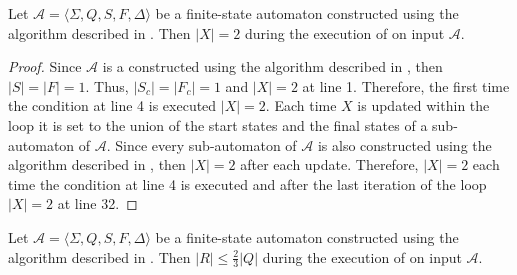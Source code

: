\begin{proposition}\label{prop:thompson_sep_4}
  Let $\mathcal{A} = \langle \Sigma, Q, S, F, \Delta \rangle$ be a finite-state
  automaton constructed using the algorithm described in . Then
  $|X| = 2$ during the execution of  on input
  $\mathcal{A}$.
\end{proposition}

\begin{proof}
  Since $\mathcal{A}$ is a constructed using the algorithm described in
  , then $|S| = |F| = 1$. Thus, $|S_c| = |F_c| = 1$ and $|X| = 2$
  at line 1. Therefore, the first time the condition at line 4 is executed $|X| = 2$.
  Each time $X$ is updated within the loop it is set to the union of the start states
  and the final states of a sub-automaton of $\mathcal{A}$. Since every sub-automaton
  of $\mathcal{A}$ is also constructed using the algorithm described in
  , then $|X| = 2$ after each update. Therefore, $|X| = 2$ each
  time the condition at line 4 is executed and after the last iteration of the loop
  $|X| = 2$ at line 32.
\end{proof}

\begin{proposition}\label{prop:thompson_sep_5}
  Let $\mathcal{A} = \langle \Sigma, Q, S, F, \Delta \rangle$ be a finite-state
  automaton constructed using the algorithm described in . Then
  $|R| \leq \frac{2}{3} |Q|$ during the execution of  on
  input $\mathcal{A}$.
\end{proposition}

